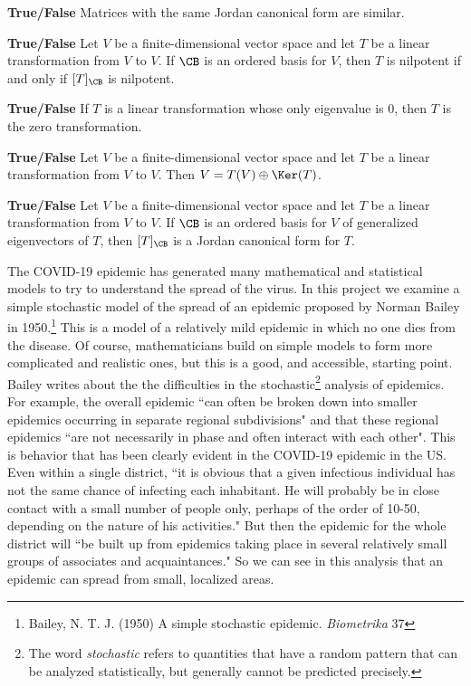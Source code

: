 	\item \textbf{True/False} Matrices with the same Jordan canonical form are similar.
	
	\item \textbf{True/False} Let $V$ be a finite-dimensional vector space and let $T$ be a linear transformation from $V$ to $V$. If $\CB$ is an ordered basis for $V$, then $T$ is nilpotent if and only if $[T]_{\CB}$ is nilpotent. 
	
	\item \textbf{True/False} If $T$ is a linear transformation whose only eigenvalue is 0, then $T$ is the zero transformation.
	
	\item \textbf{True/False} Let $V$ be a finite-dimensional vector space and let $T$ be a linear transformation from $V$ to $V$. Then $V = T(V) \oplus \Ker(T)$. 

	\item  \textbf{True/False} Let $V$ be a finite-dimensional vector space and let $T$ be a linear transformation from $V$ to $V$. If $\CB$ is an ordered basis for $V$ of generalized eigenvectors of $T$, then $[T]_{\CB}$ is a Jordan canonical form for $T$.
	
	 
	\ea
	
\ee
	
\label{sec:proj_epidemic}

The COVID-19 epidemic has generated many mathematical and statistical models to try to understand the spread of the virus. In this project we examine a simple stochastic model of the spread of an epidemic proposed by Norman Bailey in 1950.\footnote{Bailey, N. T. J. (1950) A simple stochastic epidemic. \emph{Biometrika} 37} This is a model of a relatively mild epidemic in which no one dies from the disease. Of course, mathematicians build on simple models to form more complicated and realistic ones, but this is a good, and accessible, starting point. Bailey writes about the the difficulties in the stochastic\footnote{The word \emph{stochastic} refers to quantities that have a random pattern that can be analyzed statistically, but generally cannot be predicted precisely.} analysis of epidemics. For example, the overall epidemic ``can often be broken down into smaller epidemics occurring in separate regional subdivisions" and that these regional epidemics ``are not necessarily in phase and often interact with each other". This is behavior that has been clearly evident in the COVID-19 epidemic in the US. Even within a single district, ``it is obvious that a given infectious individual has not the same chance of infecting each inhabitant. He will probably be in close contact with a small number of people only, perhaps of the order of 10-50, depending on the nature of his activities." But then the  epidemic for the whole district will ``be built up from epidemics taking place in several relatively small groups of associates and acquaintances."  So we can see in this analysis that an epidemic can spread from small, localized areas. 

